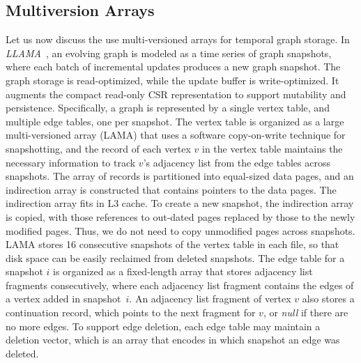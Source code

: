 \documentclass{svjour3}
\begin{document}
\subsection{Multiversion Arrays}
Let us now discuss the use multi-versioned arrays for temporal graph storage. In {\em LLAMA}~\cite{macko2015llama}, an evolving graph is modeled as a time series of graph snapshots, where each batch of incremental updates produces a new graph snapshot. The graph storage is read-optimized, while the update buffer is write-optimized.
It augments the compact read-only CSR representation to support mutability and persistence. Specifically, a graph is represented by a single vertex table, and multiple edge tables, one per snapshot. The vertex table is organized as a large multi-versioned array (LAMA) that uses a software copy-on-write technique for snapshotting, and the record of each vertex $v$ in the vertex table maintains the necessary information to track $v$'s adjacency list from the edge tables across snapshots. 
The array of records is partitioned into equal-sized data pages, and an indirection array is constructed that contains pointers to the data pages. The indirection array fits in L3 cache. To create a new snapshot, the indirection array is copied, with those references to out-dated pages replaced by those to the newly modified pages. Thus, we do not need to copy unmodified pages across snapshots. LAMA stores 16 consecutive snapshots of the vertex table in each file, so that disk space can be easily reclaimed from deleted snapshots. 
The edge table for a snapshot $i$ is organized as a fixed-length array that stores adjacency list fragments consecutively, where each adjacency list fragment contains the edges of a vertex added in snapshot~$i$. An adjacency list fragment of vertex $v$ also stores a continuation record, which points to the next fragment for $v$, or {\em null} if there are no more edges. To support edge deletion, each edge table may maintain a deletion vector, which is an array that encodes in which snapshot an edge was deleted.


\end{document}
